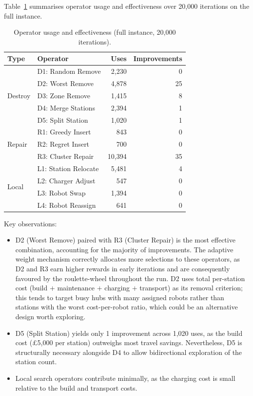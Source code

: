\documentclass[11pt,a4paper]{article}
\begin{document}
Table~\ref{tab:operator-stats} summarises operator usage and effectiveness over 20,000 iterations on the full instance.

\begin{table}[H]
\centering
\caption{Operator usage and effectiveness (full instance, 20,000 iterations).}
\label{tab:operator-stats}
\begin{tabular}{llrr}
\toprule
Type & Operator & Uses & Improvements \\
\midrule
\multirow{5}{*}{Destroy}
 & D1: Random Remove  & 2,230  & 0 \\
 & D2: Worst Remove   & 4,878  & 25 \\
 & D3: Zone Remove    & 1,415  & 8 \\
 & D4: Merge Stations & 2,394  & 1 \\
 & D5: Split Station  & 1,020  & 1 \\
\midrule
\multirow{3}{*}{Repair}
 & R1: Greedy Insert  & 843    & 0 \\
 & R2: Regret Insert  & 700    & 0 \\
 & R3: Cluster Repair & 10,394 & 35 \\
\midrule
\multirow{4}{*}{Local}
 & L1: Station Relocate & 5,481 & 4 \\
 & L2: Charger Adjust   & 547   & 0 \\
 & L3: Robot Swap       & 1,394 & 0 \\
 & L4: Robot Reassign   & 641   & 0 \\
\bottomrule
\end{tabular}
\end{table}

\noindent
Key observations:
\begin{itemize}[nosep]
  \item D2 (Worst Remove) paired with R3 (Cluster Repair) is the most effective combination,
  accounting for the majority of improvements.
  The adaptive weight mechanism correctly allocates more selections to these operators, as
  D2 and R3 earn higher rewards in early iterations and are consequently favoured by the
  roulette-wheel throughout the run.
  D2 uses total per-station cost (build $+$ maintenance $+$ charging $+$ transport) as its
  removal criterion; this tends to target busy hubs with many assigned robots rather than
  stations with the worst cost-per-robot ratio, which could be an alternative design worth
  exploring.
  \item D5 (Split Station) yields only 1 improvement across 1,020 uses, as the build cost
  (\pounds5{,}000 per station) outweighs most travel savings.
  Nevertheless, D5 is structurally necessary alongside D4 to allow bidirectional exploration
  of the station count.
  \item Local search operators contribute minimally, as the charging cost is small relative to
  the build and transport costs.
\end{itemize}
\end{document}
